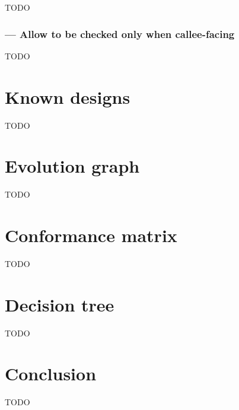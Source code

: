 TODO

\subsubsection{ --- Allow  to be checked only when callee-facing}

TODO

\section{Known designs}
\label{designs}

TODO

\section{Evolution graph}
\label{evolution}

TODO

\section{Conformance matrix}
\label{matrix}

TODO

\section{Decision tree}
\label{tree}

TODO

\section{Conclusion}
\label{conclusion}

TODO




\renewcommand{\addcontentsline}[3]{}%







